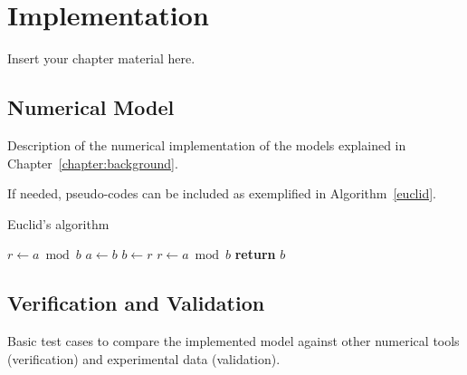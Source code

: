 
\chapter{Implementation}
\label{chapter:implementation}

Insert your chapter material here.

\section{Numerical Model}
\label{section:model}

Description of the numerical implementation of the models explained in Chapter~\ref{chapter:background}.

If needed, pseudo-codes can be included as exemplified in Algorithm~\ref{euclid}.
%
%
\begin{algorithm}
\caption{Euclid’s algorithm}\label{euclid}
\begin{algorithmic}[1]
   \State $r\gets a\bmod b$
      \State $a\gets b$
      \State $b\gets r$
      \State $r\gets a\bmod b$
   \EndWhile\label{euclidendwhile}
   \State \textbf{return} $b$
\EndProcedure
\end{algorithmic}
\end{algorithm}


\section{Verification and Validation}
\label{section:verification}

Basic test cases to compare the implemented model against other numerical tools (verification) and experimental data (validation).

